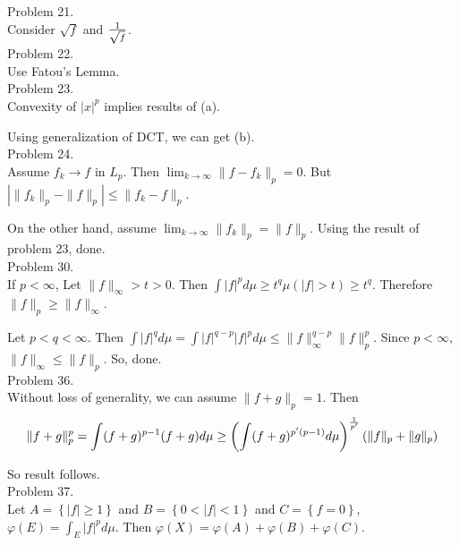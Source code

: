 Problem 21. \\

Consider $\sqrt{f}$ and ${1\over \sqrt{f}}$. \\

Problem 22. \\

Use Fatou's Lemma. \\

Problem 23. \\

Convexity of $|x|^p$ implies results of (a).

Using generalization of DCT, we can get (b). \\

Problem 24. \\

Assume $f_k \rightarrow f$ in $L_p$. Then $\lim_{k\rightarrow \infty} \| f-f_k \|_p = 0$. But $| \|f_k \|_p - \|f \|_p | \leq \|f_k - f \|_p$. 

On the other hand, assume $\lim_{k\rightarrow \infty}\|f_k\|_p = \|f\|_p$. Using the result of problem 23, done. \\

Problem 30. \\

If $p < \infty$, Let $\|f \|_{\infty} > t > 0$. Then $\int |f|^p d\mu \geq t^q \mu\left( |f| > t \right) \geq t^q$. Therefore $\| f \|_p \geq \|f \|_{\infty}$. 

Let $p < q < \infty$. Then $\int |f|^q d\mu = \int |f|^{q-p} |f|^p d\mu \leq \|f\|_{\infty}^{q-p} \|f\|_{p}^p$. Since $p < \infty$, $\| f \| _{\infty} \leq \|f \|_p$. So, done. \\

Problem 36. \\

Without loss of generality, we can assume $\| f+g \|_p =1$. Then
\begin{equation*}
	\|f+g\|_p^p = \int (f+g)^{p-1}(f+g)d\mu \geq \left( \int (f+g)^{p'(p-1)}d\mu \right)^{1\over p'}\left( \|f\|_p + \|g\|_p \right)
	\label{<+label+>}
\end{equation*}

So result follows. \\

Problem 37. \\

Let $A = \left\{ |f| \geq 1 \right\}$ and $B = \left\{ 0 < |f| < 1 \right\}$ and $C = \left\{ f = 0 \right\}$, $\varphi\left( E \right) = \int_E |f|^p d\mu$. Then $\varphi\left( X \right) = \varphi\left( A \right) + \varphi\left( B \right) + \varphi\left( C \right)$. 

